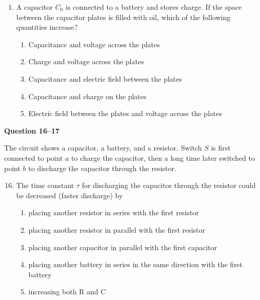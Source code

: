 \documentclass{../../oss-apphys}
\begin{document}
\begin{multicols}{2}
\begin{enumerate}[leftmargin=18pt]
    \columnbreak

  \item A capacitor $C_0$ is connected to a battery and stores charge. If the
    space between the capacitor plates is filled with oil, which of the
    following quantities increase?
    \begin{enumerate}[noitemsep,topsep=0pt,leftmargin=18pt,label=(\Alph*)]
    \item Capacitance and voltage across the plates
    \item Charge and voltage across the plates
    \item Capacitance and electric field between the plates
    \item Capacitance and charge on the plates
    \item Electric field between the plates and voltage across the plates
    \end{enumerate}
  \end{enumerate}

  \textbf{Question 16--17}
  
  The circuit shows a capacitor, a battery, and a resistor. Switch $S$ is first
  connected to point $a$ to charge the capacitor, then a long time later
  switched to point $b$ to discharge the capacitor through the resistor.
  \begin{center}
  \end{center}
  
  \begin{enumerate}[leftmargin=18pt]
    \setcounter{enumi}{15}
  \item The time constant $\tau$ for discharging the capacitor through the
    resistor could be decreased (faster discharge) by
    \begin{enumerate}[noitemsep,topsep=0pt,leftmargin=18pt,label=(\Alph*)]
    \item placing another resistor in series with the first resistor
    \item placing another resistor in parallel with the first resistor
    \item placing another capacitor in parallel with the first capacitor
    \item placing another battery in series in the same direction with the
      first battery
    \item increasing both R and C
    \end{enumerate}


\end{enumerate}
\end{multicols}
\end{document}
